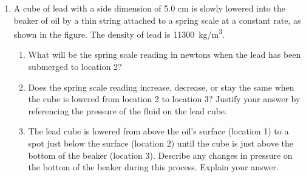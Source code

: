 \documentclass{../../../oss-apphys}
\begin{document}
\begin{enumerate}[leftmargin=15pt]
\begin{enumerate}[leftmargin=18pt]
  \item A cube of lead with a side dimension of 5.0 cm is slowly lowered into
    the beaker of oil by a thin string attached to a spring scale at a constant
    rate, as shown in the figure. The density of lead is \SI{11300}{kg/m^3}.
    \begin{center}
    \end{center}
    \begin{enumerate}
    \item What will be the spring scale reading in newtons when the lead has
      been submerged to location 2?
    \item Does the spring scale reading increase, decrease, or stay the same
      when the cube is lowered from location 2 to location 3? Justify your
      answer by referencing the pressure of the fluid on the lead cube.
    \item The lead cube is lowered from above the oil's surface (location 1) to
      a spot just below the surface (location 2) until the cube is just above
      the bottom of the beaker (location 3). Describe any changes in pressure
      on the bottom of the beaker during this process. Explain your answer.
    \end{enumerate}
  \end{enumerate}
  \newpage


\end{enumerate}
\end{document}
